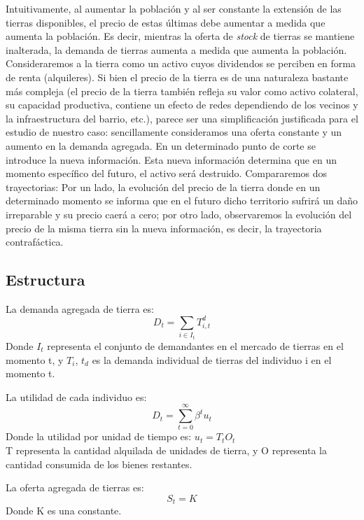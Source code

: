 \documentclass[12pt]{article}
\begin{document}
Intuitivamente, al aumentar la población y al ser constante la extensión de las tierras disponibles, el precio de estas últimas debe aumentar a medida que aumenta la población. Es decir, mientras la oferta de \textit{stock} de tierras se mantiene inalterada, la demanda de tierras aumenta a medida que aumenta la población. Consideraremos a la tierra como un activo cuyos dividendos se perciben en forma de renta (alquileres). Si bien el precio de la tierra es de una naturaleza bastante más compleja (el precio de la tierra también refleja su valor como activo colateral, su capacidad productiva, contiene un efecto de redes dependiendo de los vecinos y la infraestructura del barrio, etc.), parece ser una simplificación justificada para el estudio de nuestro caso: sencillamente consideramos una oferta constante y un aumento en la demanda agregada.
En un determinado punto de corte se introduce la nueva información. Esta nueva información determina que en un momento específico del futuro, el activo será destruido. Compararemos dos trayectorias: Por un lado, la evolución del precio de la tierra donde en un determinado momento se informa que en el futuro dicho territorio sufrirá un daño irreparable y su precio caerá a cero; por otro lado, observaremos la evolución del precio de la misma tierra sin la nueva información, es decir, la trayectoria contrafáctica. 
\subsection{Estructura}
\item La demanda agregada de tierra es:
\begin{equation}
D_t= \sum_{i \in I_t}{T^{d}_{i,t}}
\end{equation}
Donde  {$I_t$}  representa el conjunto de demandantes en el mercado de tierras en el momento t, y {$T_i$}, {$t_d$} es la demanda individual de tierras del individuo i en el momento t.

\item La utilidad de cada individuo es:
\begin{equation}
D_t= \sum_{t=0}^{\infty}{\beta^{t}u_t}
\end{equation}
Donde la utilidad por unidad de tiempo es: {$u_t=T_tO_t$} \\
T representa la cantidad alquilada de unidades de tierra, y O representa la cantidad consumida de los bienes restantes.

\item La oferta agregada de tierras es:
\begin{equation}
S_t=K
\end{equation}
Donde K es una constante.
\end{document}
